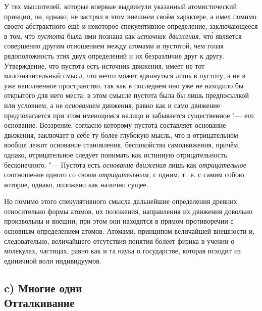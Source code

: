 У тех мыслителей, которые впервые выдвинули указанный атомистический
принцип, он, однако, не застрял в этом внешнем своём характере, а имел
помимо своего абстрактного ещё и некоторое спекулятивное определение,
заключающееся в том, что {\em пустота} была ими познана
как {\em источник движения,} чт\'{о} является совершенно
другим отношением между атомами и пустотой, чем голая рядоположность этих
двух определений и их безразличие друг к другу. Утверждение, что пустота
есть источник движения, имеет не тот малозначительный смысл, что нечто
может вдвинуться лишь в пустоту, а не в уже наполненное пространство, так
как в последнем оно уже не находило бы открытого для него места; в этом
смысле пустота была бы лишь предпосылкой или условием, а не
{\em основанием} движения, равно как и само движение
предполагается при этом имеющимся налицо и забывается существенное "--- его
основание. Воззрение, согласно которому пустота составляет основание
движения, заключает в себе ту более глубокую мысль, что в отрицательном
вообще лежит основание становления, беспокойства самодвижения, причём,
однако, отрицательное следует понимать как истинную отрицательность
бесконечного. "--- Пустота есть {\em основание движения}
лишь как {\em отрицательное} соотношение одного со
своим {\em отрицательным,} с одним, т.~е. с самим
собою, которое, однако, положено как налично сущее.

Но помимо этого спекулятивного смысла дальнейшие определения древних
относительно формы атомов, их положения, направления их движения довольно
произвольны и внешни; при этом они находятся в прямом противоречии с
основным определением атомов. Атомами, принципом величайшей внешности и,
следовательно, величайшего отсутствия понятия болеет физика в учении о
молекулах, частицах, равно как и та наука о государстве, которая исходит из
единичной воли индивидуумов.

\subsection[c) Многие одни. Отталкивание]%
{c) Многие одни\vspace{2mm}\\{\mdseries\lsstyle Отталкивание}}

